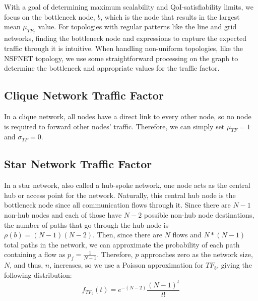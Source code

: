 
With a goal of determining maximum scalability and QoI-satisfiability limits, we focus on the bottleneck node, $b$, which is the node that results in the largest mean $\mu_{TF_x}$ value. For topologies with regular patterns like the line and grid networks, finding the bottleneck node and expressions to capture the expected traffic through it is intuitive. When handling non-uniform topologies, like the NSFNET topology, we use some straightforward processing on the graph to determine the bottleneck and appropriate values for the traffic factor.

\subsection{Clique Network Traffic Factor}
In a clique network, all nodes have a direct link to every other node, so no node is required to forward other nodes' traffic.  Therefore, we can simply set $\mu_{TF} = 1$ and $\sigma_{TF} = 0$.

{\color{blue}
\subsection{Star Network Traffic Factor}
In a star network, also called a hub-spoke network, one node acts as the central hub or access point for the network. Naturally, this central hub node is the bottleneck node since all communication flows through it. Since there are $N-1$ non-hub nodes and each of those have $N-2$ possible non-hub node destinations, the number of paths that go through the hub node is $\rho(b) = (N-1)(N-2)$. Then, since there are $N$ flows and $N*(N-1)$ total paths in the network, we can approximate the probability of each path containing a flow as $p_f = \frac{1}{N-1}$. Therefore, $p$ approaches zero as the network size, $N$, and thus, $n$, increases, so we use a Poisson approximation for $TF_b$, giving the following distribution: 
\begin{equation*}
	f_{TF_b}(t) = e^{-(N-2)}\frac{(N-1)^{t}}{t!}
\end{equation*} 
}

